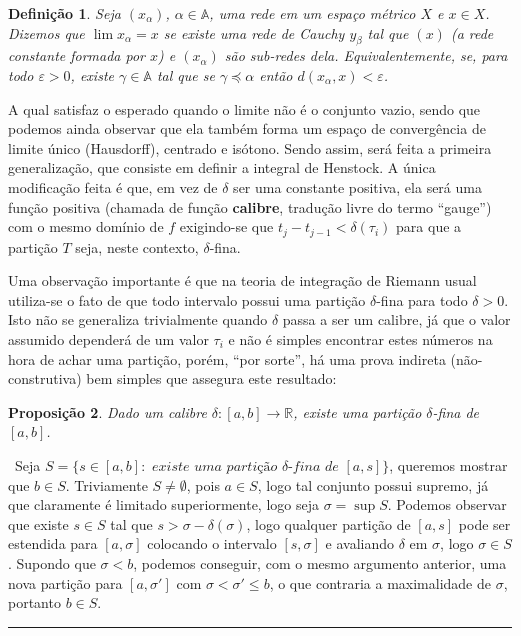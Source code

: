 \documentclass[12pt, a4paper]{article}
\newtheorem{mydef}{Definição}[section]
\newtheorem{prop}[mydef]{Proposição}
\def\dem{\par\smallbreak\noindent {\textit{ Demonstração:}} \ }
\def\eop{\hfill\rule{2.5mm}{2.5mm}}
\theoremstyle{definition}
\begin{document}
\begin{mydef}
	
Seja $(x_\alpha)$, $\alpha \in \mathbb{A}$, uma rede em um espaço métrico $X$ e $x\in X$. Dizemos que $\lim x_\alpha =x$ se existe uma rede de Cauchy $y_\beta$ tal que $(x)$ (a rede constante formada por $x$) e $(x_\alpha)$ são sub-redes dela. Equivalentemente, se, para todo $\varepsilon >0$, existe $\gamma \in \mathbb{A}$ tal que se $\gamma \preccurlyeq \alpha$ então $d (x_\alpha , x)<\varepsilon$.
	
\end{mydef}

A qual satisfaz o esperado quando o limite não é o conjunto vazio, sendo que podemos ainda observar que ela também forma um espaço de convergência de limite único (Hausdorff), centrado e isótono. Sendo assim, será feita a primeira generalização, que consiste em definir a integral de Henstock. A única modificação feita é que, em vez de $\delta$ ser uma constante positiva, ela será uma função positiva (chamada de função \textbf{calibre}, tradução livre do termo ``gauge'') com o mesmo domínio de $f$ exigindo-se que $t_{j}-t_{j-1}< \delta (\tau_i)$ para que a partição $T$ seja, neste contexto, $\delta$-fina. 


Uma observação importante é que na teoria de integração de Riemann usual utiliza-se o fato de que todo intervalo possui uma partição $\delta$-fina para todo $\delta>0$. Isto não se generaliza trivialmente quando $\delta$ passa a ser um calibre, já que o valor assumido dependerá de um valor $\tau_i$ e não é simples encontrar estes números na hora de achar uma partição, porém, ``por sorte'', há uma prova indireta (não-construtiva) bem simples que assegura este resultado:

\begin{prop}
	
	Dado um calibre $\delta:[a,b]\rightarrow \mathbb{R}$, existe uma partição $\delta$-fina de $[a,b]$.
 
\end{prop}

\dem Seja $S=\{ s\in [a,b]: \textit{ existe uma partição } \delta \textit{-fina de } [a,s] \}$, queremos mostrar que $b\in S$. Triviamente $S\neq \emptyset$, pois $a\in S$, logo tal conjunto possui supremo, já que claramente é limitado superiormente, logo seja $\sigma = \sup S$. Podemos observar que existe $s\in S$ tal que $s>\sigma-\delta (\sigma)$, logo qualquer partição de $[a,s]$ pode ser estendida para $[a,\sigma ]$ colocando o intervalo $[s,\sigma]$ e avaliando $\delta$ em $\sigma$, logo $\sigma \in S$. Supondo que $\sigma<b$, podemos conseguir, com o mesmo argumento anterior, uma nova partição para $[a,\sigma ']$ com $\sigma <\sigma ' \leq b$, o que contraria a maximalidade de $\sigma$, portanto $b\in S$. \eop \\
\end{document}
